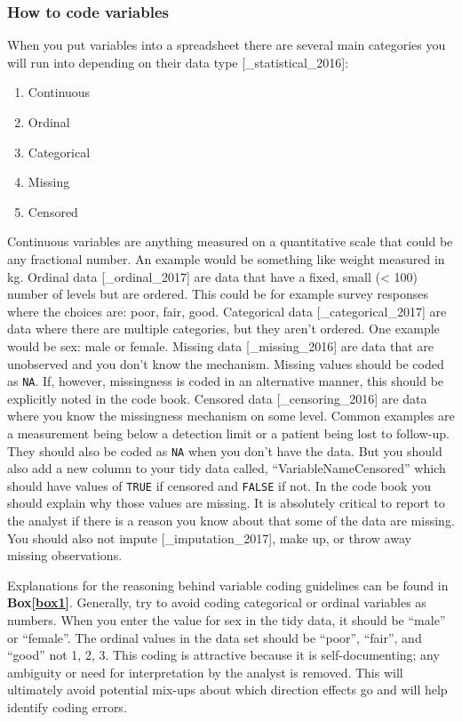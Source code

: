 \documentclass[12pt]{article}
\providecommand{\tightlist}{%
  \setlength{\itemsep}{0pt}\setlength{\parskip}{0pt}}
\begin{document}
\subsubsection{How to code variables}\label{how-to-code-variables}

When you put variables into a spreadsheet there are several main
categories you will run into depending on their data type
{[}\_statistical\_2016{]}:

\begin{enumerate}
\def\labelenumi{\arabic{enumi}.}
\tightlist
\item
  Continuous
\item
  Ordinal
\item
  Categorical
\item
  Missing
\item
  Censored
\end{enumerate}

Continuous variables are anything measured on a quantitative scale that
could be any fractional number. An example would be something like
weight measured in kg. Ordinal data {[}\_ordinal\_2017{]} are data that
have a fixed, small (\textless{} 100) number of levels but are ordered.
This could be for example survey responses where the choices are: poor,
fair, good. Categorical data {[}\_categorical\_2017{]} are data where
there are multiple categories, but they aren't ordered. One example
would be sex: male or female. Missing data {[}\_missing\_2016{]} are
data that are unobserved and you don't know the mechanism. Missing
values should be coded as \texttt{NA}. If, however, missingness is coded
in an alternative manner, this should be explicitly noted in the code
book. Censored data {[}\_censoring\_2016{]} are data where you know the
missingness mechanism on some level. Common examples are a measurement
being below a detection limit or a patient being lost to follow-up. They
should also be coded as \texttt{NA} when you don't have the data. But
you should also add a new column to your tidy data called,
``VariableNameCensored'' which should have values of \texttt{TRUE} if
censored and \texttt{FALSE} if not. In the code book you should explain
why those values are missing. It is absolutely critical to report to the
analyst if there is a reason you know about that some of the data are
missing. You should also not impute {[}\_imputation\_2017{]}, make up,
or throw away missing observations.

Explanations for the reasoning behind variable coding guidelines can be
found in \textbf{Box\ref{box1}}. Generally, try to avoid coding
categorical or ordinal variables as numbers. When you enter the value
for sex in the tidy data, it should be ``male'' or ``female''. The
ordinal values in the data set should be ``poor'', ``fair'', and
``good'' not 1, 2, 3. This coding is attractive because it is
self-documenting; any ambiguity or need for interpretation by the
analyst is removed. This will ultimately avoid potential mix-ups about
which direction effects go and will help identify coding errors.
\end{document}
